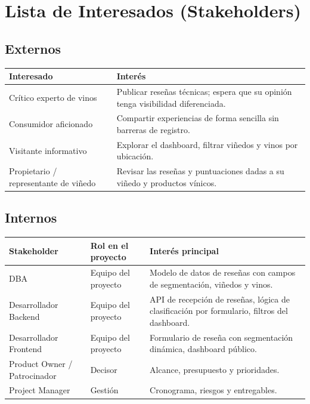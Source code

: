 \documentclass[12pt, a4paper]{article}
\begin{document}
\section{Lista de Interesados (Stakeholders)}

\subsection{Externos}

\begin{tabularx}{\textwidth}{@{} l X @{}}
    \toprule
    \textbf{Interesado} & \textbf{Interés} \\
    \midrule
    Crítico experto de vinos            & Publicar reseñas técnicas; espera que su opinión tenga visibilidad diferenciada. \\[6pt]
    Consumidor aficionado               & Compartir experiencias de forma sencilla sin barreras de registro. \\[6pt]
    Visitante informativo               & Explorar el dashboard, filtrar viñedos y vinos por ubicación. \\[6pt]
    Propietario / representante de viñedo & Revisar las reseñas y puntuaciones dadas a su viñedo y productos vínicos. \\
    \bottomrule
\end{tabularx}

\subsection{Internos}

\begin{tabularx}{\textwidth}{@{} l l X @{}}
    \toprule
    \textbf{Stakeholder} & \textbf{Rol en el proyecto} & \textbf{Interés principal} \\
    \midrule
    DBA                    & Equipo del proyecto & Modelo de datos de reseñas con campos de segmentación, viñedos y vinos. \\[6pt]
    Desarrollador Backend  & Equipo del proyecto & API de recepción de reseñas, lógica de clasificación por formulario, filtros del dashboard. \\[6pt]
    Desarrollador Frontend & Equipo del proyecto & Formulario de reseña con segmentación dinámica, dashboard público. \\[6pt]
    Product Owner / Patrocinador & Decisor      & Alcance, presupuesto y prioridades. \\[6pt]
    Project Manager        & Gestión             & Cronograma, riesgos y entregables. \\
    \bottomrule
\end{tabularx}
\end{document}
